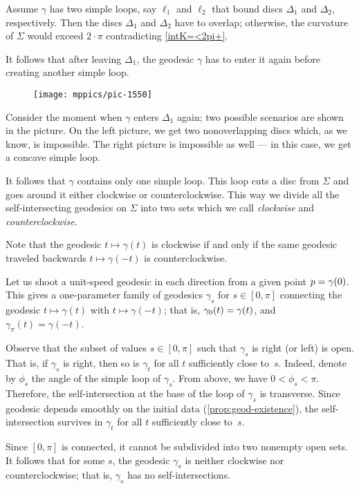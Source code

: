 Assume $\gamma$ has two simple loops, say $\ell_1$ and $\ell_2$ that bound discs $\Delta_1$ and $\Delta_2$, respectively.
Then the discs $\Delta_1$ and $\Delta_2$ have to overlap;
otherwise, the curvature of $\Sigma$ would exceed $2\cdot\pi$  contradicting \ref{intK=<2pi+}.


It follows that after leaving $\Delta_1$, the geodesic $\gamma$ has to enter it again before creating another simple loop.
\begin{figure}[h!]
\vskip-0mm
\centering
\texttt{[image: mppics/pic-1550]}
\end{figure}
Consider the moment when $\gamma$ enters $\Delta_1$ again;
two possible scenarios are shown in the picture.
On the left picture, we get two nonoverlapping discs which, as we know, is impossible.
The right picture is impossible as well --- in this case, we get a concave simple loop.

It follows that $\gamma$ contains only one simple loop.
This loop cuts a disc from $\Sigma$ 
and goes around it either clockwise or counterclockwise.
This way we divide all the self-intersecting geodesics on $\Sigma$
into two sets which we call {}\emph{clockwise} and {}\emph{counterclockwise}.

Note that the geodesic $t\mapsto \gamma(t)$ is clockwise 
if and only if the same geodesic traveled backwards
$t\mapsto \gamma(-t)$
is counterclockwise.

Let us shoot a unit-speed geodesic in each direction from a given point $p\z=\gamma(0)$.
This gives a one-parameter family of geodesics $\gamma_s$ for $s\in[0,\pi]$ connecting the geodesic $t\mapsto \gamma(t)$ with $t\mapsto \gamma(-t)$; that is, $\gamma_0(t)\z=\gamma(t)$, and $\gamma_\pi(t)=\gamma(-t)$.

Observe that the subset of values $s\in [0,\pi]$ such that $\gamma_s$ is right (or left) is open.
That is, if $\gamma_s$ is right, then so is $\gamma_t$ for all $t$ sufficiently close to~$s$.
Indeed, denote by $\phi_s$ the angle of the simple loop of $\gamma_s$.
From above, we have $0<\phi_s<\pi$.
Therefore, the self-intersection at the base of the loop of $\gamma_s$ is transverse.
Since geodesic depends smoothly on the initial data 
(\ref{prop:geod-existence}), the self-intersection survives in $\gamma_t$ for all $t$ sufficiently close to~$s$.

Since $[0,\pi]$ is connected, it cannot be subdivided into two nonempty open sets.
It follows that for some $s$, the geodesic $\gamma_s$ is neither  clockwise nor counterclockwise;
that is, $\gamma_s$ has no self-intersections.
\qeds

